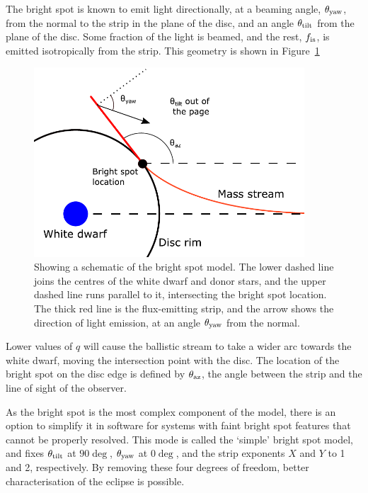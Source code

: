 The bright spot is known to emit light directionally, at a beaming angle, $\theta_{\rm yaw}$, from the normal to the strip in the plane of the disc, and an angle $\theta_{\rm tilt}$ from the plane of the disc.
Some fraction of the light is beamed, and the rest, $f_{\rm is}$, is emitted isotropically from the strip. This geometry is shown in Figure~\ref{fig:modelling:bright spot schematic}
\begin{figure}
    \centering
    \includegraphics[width=0.9\textwidth]{figures/modelling/bright_spot_schematic.pdf}
    \caption{Showing a schematic of the bright spot model. The lower dashed line joins the centres of the white dwarf and donor stars, and the upper dashed line runs parallel to it, intersecting the bright spot location. The thick red line is the flux-emitting strip, and the arrow shows the direction of light emission, at an angle $\theta_{\rm yaw}$ from the normal.}
    \label{fig:modelling:bright spot schematic}
\end{figure}

Lower values of $q$ will cause the ballistic stream to take a wider arc towards the white dwarf, moving the intersection point with the disc. The location of the bright spot on the disc edge is defined by $\theta_{\rm az}$, the angle between the strip and the line of sight of the observer.

As the bright spot is the most complex component of the model, there is an option to simplify it in software for systems with faint bright spot features that cannot be properly resolved.
This mode is called the `simple' bright spot model, and fixes $\theta_{\rm tilt}$ at $90\deg$, $\theta_{\rm yaw}$ at $0\deg$, and the strip exponents $X$ and $Y$ to 1 and 2, respectively. By removing these four degrees of freedom, better characterisation of the eclipse is possible.

